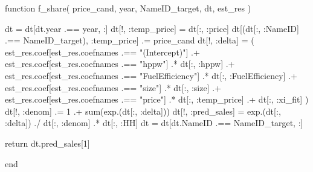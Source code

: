 \documentclass[
  letterpaper,
  DIV=11,
  numbers=noendperiod]{scrreprt}
\newenvironment{Shaded}{\begin{snugshade}}{\end{snugshade}}
\newcommand{\ControlFlowTok}[1]{\textcolor[rgb]{0.00,0.23,0.31}{#1}}
\newcommand{\FloatTok}[1]{\textcolor[rgb]{0.68,0.00,0.00}{#1}}
\newcommand{\FunctionTok}[1]{\textcolor[rgb]{0.28,0.35,0.67}{#1}}
\newcommand{\KeywordTok}[1]{\textcolor[rgb]{0.00,0.23,0.31}{#1}}
\newcommand{\NormalTok}[1]{\textcolor[rgb]{0.00,0.23,0.31}{#1}}
\newcommand{\OperatorTok}[1]{\textcolor[rgb]{0.37,0.37,0.37}{#1}}
\newcommand{\StringTok}[1]{\textcolor[rgb]{0.13,0.47,0.30}{#1}}
\begin{document}
\begin{Shaded}
\begin{Highlighting}[]
\KeywordTok{function} \FunctionTok{f\_share}\NormalTok{(}
\NormalTok{        price\_cand,}
\NormalTok{        year, }
\NormalTok{        NameID\_target,}
\NormalTok{        dt,}
\NormalTok{        est\_res}
\NormalTok{    )}
    
\NormalTok{    dt }\OperatorTok{=}\NormalTok{ dt[dt.year }\OperatorTok{.==}\NormalTok{ year, }\OperatorTok{:}\NormalTok{]}
\NormalTok{    dt[!, }\OperatorTok{:}\NormalTok{temp\_price] }\OperatorTok{=}\NormalTok{ dt[}\OperatorTok{:}\NormalTok{, }\OperatorTok{:}\NormalTok{price]}
\NormalTok{    dt[(dt[}\OperatorTok{:}\NormalTok{, }\OperatorTok{:}\NormalTok{NameID] }\OperatorTok{.==}\NormalTok{ NameID\_target), }\OperatorTok{:}\NormalTok{temp\_price] }\OperatorTok{.=}\NormalTok{ price\_cand}
\NormalTok{    dt[!, }\OperatorTok{:}\NormalTok{delta] }\OperatorTok{=}\NormalTok{ (}
\NormalTok{        est\_res.coef[est\_res.coefnames }\OperatorTok{.==} \StringTok{"(Intercept)"}\NormalTok{] }\OperatorTok{.+}
\NormalTok{        est\_res.coef[est\_res.coefnames }\OperatorTok{.==} \StringTok{"hppw"}\NormalTok{] }\OperatorTok{.*}\NormalTok{ dt[}\OperatorTok{:}\NormalTok{, }\OperatorTok{:}\NormalTok{hppw] }\OperatorTok{.+}
\NormalTok{        est\_res.coef[est\_res.coefnames }\OperatorTok{.==} \StringTok{"FuelEfficiency"}\NormalTok{] }\OperatorTok{.*}\NormalTok{ dt[}\OperatorTok{:}\NormalTok{, }\OperatorTok{:}\NormalTok{FuelEfficiency] }\OperatorTok{.+}
\NormalTok{        est\_res.coef[est\_res.coefnames }\OperatorTok{.==} \StringTok{"size"}\NormalTok{] }\OperatorTok{.*}\NormalTok{ dt[}\OperatorTok{:}\NormalTok{, }\OperatorTok{:}\NormalTok{size] }\OperatorTok{.+}
\NormalTok{        est\_res.coef[est\_res.coefnames }\OperatorTok{.==} \StringTok{"price"}\NormalTok{] }\OperatorTok{.*}\NormalTok{ dt[}\OperatorTok{:}\NormalTok{, }\OperatorTok{:}\NormalTok{temp\_price] }\OperatorTok{.+}
\NormalTok{        dt[}\OperatorTok{:}\NormalTok{, }\OperatorTok{:}\NormalTok{xi\_fit]}
\NormalTok{    )}
\NormalTok{    dt[!, }\OperatorTok{:}\NormalTok{denom] }\OperatorTok{.=} \FloatTok{1} \OperatorTok{.+} \FunctionTok{sum}\NormalTok{(}\FunctionTok{exp}\NormalTok{.(dt[}\OperatorTok{:}\NormalTok{, }\OperatorTok{:}\NormalTok{delta]))}
\NormalTok{    dt[!, }\OperatorTok{:}\NormalTok{pred\_sales] }\OperatorTok{=} \FunctionTok{exp}\NormalTok{.(dt[}\OperatorTok{:}\NormalTok{, }\OperatorTok{:}\NormalTok{delta]) }\OperatorTok{./}\NormalTok{ dt[}\OperatorTok{:}\NormalTok{, }\OperatorTok{:}\NormalTok{denom] }\OperatorTok{.*}\NormalTok{ dt[}\OperatorTok{:}\NormalTok{, }\OperatorTok{:}\NormalTok{HH]}
\NormalTok{    dt }\OperatorTok{=}\NormalTok{ dt[dt.NameID }\OperatorTok{.==}\NormalTok{ NameID\_target, }\OperatorTok{:}\NormalTok{]}
    
    \ControlFlowTok{return}\NormalTok{ dt.pred\_sales[}\FloatTok{1}\NormalTok{]}
    
\KeywordTok{end}
\end{Highlighting}
\end{Shaded}
\end{document}
